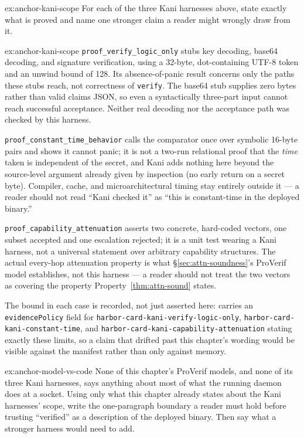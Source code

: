 \documentclass[11pt,a4paper]{article}
\theoremstyle{definition}
\begin{document}
\begin{pdexercise}[kind=Check,rating=2]{ex:anchor-kani-scope}
For each of the three Kani harnesses above, state exactly what is proved and name one stronger claim a reader might wrongly draw from it.
\end{pdexercise}
\begin{pdsolution}{ex:anchor-kani-scope}
\texttt{proof\_verify\_logic\_only} stubs key decoding, base64 decoding, and signature verification, using a 32-byte, dot-containing UTF-8 token and an unwind bound of 128. Its absence-of-panic result concerns only the paths these stubs reach, not correctness of \texttt{verify}. The base64 stub supplies zero bytes rather than valid claims JSON, so even a syntactically three-part input cannot reach successful acceptance. Neither real decoding nor the acceptance path was checked by this harness.

\texttt{proof\_constant\_time\_behavior} calls the comparator once over symbolic 16-byte pairs and shows it cannot panic; it is not a two-run relational proof that the \emph{time} taken is independent of the secret, and Kani adds nothing here beyond the source-level argument already given by inspection (no early return on a secret byte). Compiler, cache, and microarchitectural timing stay entirely outside it --- a reader should not read ``Kani checked it'' as ``this is constant-time in the deployed binary.''

\texttt{proof\_capability\_attenuation} asserts two concrete, hard-coded vectors, one subset accepted and one escalation rejected; it is a unit test wearing a Kani harness, not a universal statement over arbitrary capability structures. The actual every-hop attenuation property is what \S\ref{sec:attn-soundness}'s ProVerif model establishes, not this harness --- a reader should not treat the two vectors as covering the property Property~\ref{thm:attn-sound} states.

The bound in each case is recorded, not just asserted here:  carries an \texttt{evidencePolicy} field for \texttt{harbor-card-kani-}\allowbreak\texttt{verify-logic-only}, \texttt{harbor-card-kani-}\allowbreak\texttt{constant-time}, and \texttt{harbor-card-kani-}\allowbreak\texttt{capability-attenuation} stating exactly these limits, so a claim that drifted past this chapter's wording would be visible against the manifest rather than only against memory.
\end{pdsolution}
\begin{pdexercise}[kind=Open,rating=3]{ex:anchor-model-vs-code}
None of this chapter's ProVerif models, and none of its three Kani harnesses, says anything about most of what the running daemon does at a socket. Using only what this chapter already states about the Kani harnesses' scope, write the one-paragraph boundary a reader must hold before trusting ``verified'' as a description of the deployed binary. Then say what a stronger harness would need to add.
\end{pdexercise}
\end{document}
